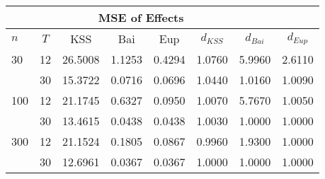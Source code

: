 \begin{tabular}{lccccccc} 
\hline \multicolumn{7}{c}{MSE of Effects} \\ \hline 
$n$ & $T$ & KSS & Bai & Eup & $d_{KSS}$ & $d_{Bai}$ & $d_{Eup}$ \\
\hline
30 & 12 &  26.5008  &  1.1253  &  0.4294  &  1.0760  &  5.9960  &  2.6110  \\
& 30 &  15.3722  &  0.0716  &  0.0696  &  1.0440  &  1.0160  &  1.0090  \\
100 & 12 &  21.1745  &  0.6327  &  0.0950  &  1.0070  &  5.7670  &  1.0050  \\
& 30 &  13.4615  &  0.0438  &  0.0438  &  1.0030  &  1.0000  &  1.0000  \\
300 & 12 &  21.1524  &  0.1805  &  0.0867  &  0.9960  &  1.9300  &  1.0000  \\
& 30 &  12.6961  &  0.0367  &  0.0367  &  1.0000  &  1.0000  &  1.0000  \\
\end{tabular} 
